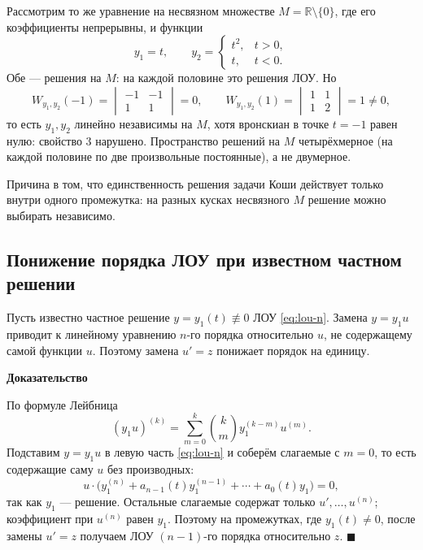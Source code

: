 \documentclass[12pt,a4paper]{article}
\numberwithin{equation}{section}
\newcommand{\R}{\mathbb{R}}
\renewenvironment{proof}[1][Доказательство]{\begin{center}\textbf{#1}\end{center}}{\hfill$\blacksquare$\par}
\begin{document}
\begin{remarkHSE}
Рассмотрим то же уравнение на несвязном множестве \(M=\R\setminus\{0\}\), где его коэффициенты непрерывны, и функции
\[
y_1=t,\qquad
y_2=\begin{cases}t^2,&t>0,\\ t,&t<0.\end{cases}
\]
Обе --- решения на \(M\): на каждой половине это решения ЛОУ. Но
\[
W_{y_1,y_2}(-1)=\begin{vmatrix}-1&-1\\1&1\end{vmatrix}=0,\qquad
W_{y_1,y_2}(1)=\begin{vmatrix}1&1\\1&2\end{vmatrix}=1\neq0,
\]
то есть \(y_1,y_2\) линейно независимы на \(M\), хотя вронскиан в точке \(t=-1\) равен нулю: свойство 3 нарушено. Пространство решений на \(M\) четырёхмерное (на каждой половине по две произвольные постоянные), а не двумерное.

Причина в том, что единственность решения задачи Коши действует только внутри одного промежутка: на разных кусках несвязного \(M\) решение можно выбирать независимо.
\end{remarkHSE}

\subsection{Понижение порядка ЛОУ при известном частном решении}

\begin{theoremHSE}
Пусть известно частное решение \(y=y_1(t)\not\equiv0\) ЛОУ \eqref{eq:lou-n}. Замена \(y=y_1u\) приводит к линейному уравнению \(n\)-го порядка относительно \(u\), не содержащему самой функции \(u\). Поэтому замена \(u'=z\) понижает порядок на единицу.
\end{theoremHSE}

\begin{proof}
По формуле Лейбница
\[
(y_1u)^{(k)}=\sum_{m=0}^{k}\binom{k}{m}y_1^{(k-m)}u^{(m)}.
\]
Подставим \(y=y_1u\) в левую часть \eqref{eq:lou-n} и соберём слагаемые с \(m=0\), то есть содержащие саму \(u\) без производных:
\[
u\cdot\bigl(y_1^{(n)}+a_{n-1}(t)y_1^{(n-1)}+\cdots+a_0(t)y_1\bigr)=0,
\]
так как \(y_1\) --- решение. Остальные слагаемые содержат только \(u',\ldots,u^{(n)}\); коэффициент при \(u^{(n)}\) равен \(y_1\). Поэтому на промежутках, где \(y_1(t)\neq0\), после замены \(u'=z\) получаем ЛОУ \((n-1)\)-го порядка относительно \(z\).
\end{proof}
\end{document}
